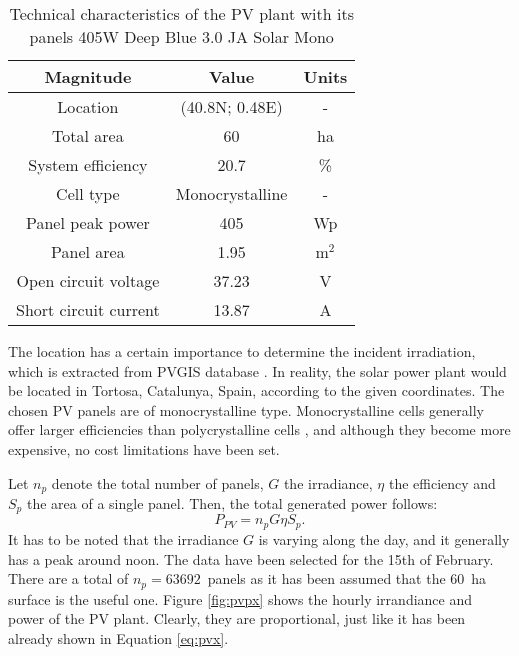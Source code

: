 \begin{table}[!htb]\centering
  \begin{tabular}{ccc}
    \hline
    \textbf{Magnitude} & \textbf{Value} & \textbf{Units}\\
    \hline
    Location & (40.8N; 0.48E) & -\\
    Total area & 60 & ha \\
    System efficiency & 20.7 & \% \\
    Cell type & Monocrystalline & - \\
    Panel peak power & 405 & Wp \\
    Panel area & 1.95 & m$^2$ \\
    Open circuit voltage & 37.23 & V \\
    Short circuit current & 13.87 & A \\
    \hline
  \end{tabular}
  \caption{Technical characteristics of the PV plant with its panels 405W Deep Blue 3.0 JA Solar Mono \cite{autosolar}}
  \label{tab:pv}
\end{table}
The location has a certain importance to determine the incident irradiation, which is extracted from PVGIS database \cite{pvgis}. In reality, the solar power plant would be located in Tortosa, Catalunya, Spain, according to the given coordinates. The chosen PV panels are of monocrystalline type. Monocrystalline cells generally offer larger efficiencies than polycrystalline cells \cite{kumar2015comparative}, and although they become more expensive, no cost limitations have been set. 

Let $n_p$ denote the total number of panels, $G$ the irradiance, $\eta$ the efficiency and $S_p$ the area of a single panel. Then, the total generated power follows:
 \begin{equation}
   P_{PV} = n_p G \eta S_p.
   \label{eq:pvx}
\end{equation}
It has to be noted that the irradiance $G$ is varying along the day, and it generally has a peak around noon. The data have been selected for the 15th of February. There are a total of $n_p=63692$~panels as it has been assumed that the 60~ha surface is the useful one. Figure \ref{fig:pvpx} shows the hourly irrandiance and power of the PV plant. Clearly, they are proportional, just like it has been already shown in Equation \ref{eq:pvx}.

